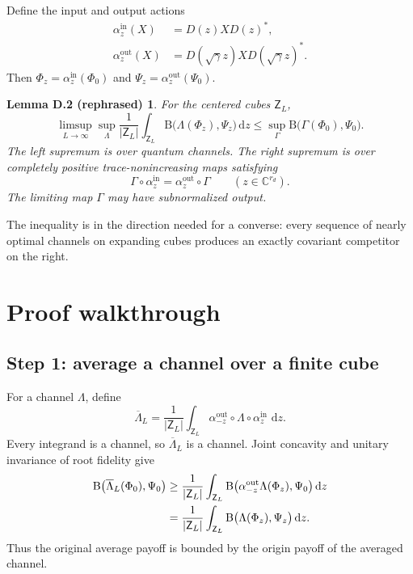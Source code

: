\documentclass[11pt]{article}
\newcommand{\C}{\mathbb C}
\newcommand{\dd}{\,\mathrm d}
\newcommand{\B}{\mathrm B}
\newtheorem*{lemmaD}{Lemma D.2 (rephrased)}
\begin{document}
Define the input and output actions
\begin{align}
  \alpha_z^{\mathrm{in}}(X)&=D(z)XD(z)^*,\label{eq:input-action}\\
  \alpha_z^{\mathrm{out}}(X)&=D(\sqrt\gamma z)XD(\sqrt\gamma z)^*.
  \label{eq:output-action}
\end{align}
Then $\Phi_z=\alpha_z^{\mathrm{in}}(\Phi_0)$ and
$\Psi_z=\alpha_z^{\mathrm{out}}(\Psi_0)$.

\begin{lemmaD}
For the centered cubes $\mathsf Z_L$,
\begin{equation}\label{eq:main-bound}
  \limsup_{L\to\infty}\sup_\Lambda
  \frac1{|\mathsf Z_L|}\int_{\mathsf Z_L}
  \B\bigl(\Lambda(\Phi_z),\Psi_z\bigr)\dd z
  \leq
  \sup_\Gamma\B\bigl(\Gamma(\Phi_0),\Psi_0\bigr).
\end{equation}
The left supremum is over quantum channels.  The right supremum is over
completely positive trace-nonincreasing maps satisfying
\[
  \Gamma\circ\alpha_z^{\mathrm{in}}
  =\alpha_z^{\mathrm{out}}\circ\Gamma
  \qquad(z\in\C^{r_d}).
\]
The limiting map $\Gamma$ may have subnormalized output.
\end{lemmaD}

The inequality is in the direction needed for a converse: every sequence of
nearly optimal channels on expanding cubes produces an exactly covariant
competitor on the right.

\section{Proof walkthrough}

\subsection{Step 1: average a channel over a finite cube}

For a channel $\Lambda$, define
\begin{equation}\label{eq:averaged-channel}
  \overline\Lambda_L
  =\frac1{|\mathsf Z_L|}\int_{\mathsf Z_L}
  \alpha_{-z}^{\mathrm{out}}\circ\Lambda
  \circ\alpha_z^{\mathrm{in}}\,\dd z.
\end{equation}
Every integrand is a channel, so $\overline\Lambda_L$ is a channel.  Joint
concavity and unitary invariance of root fidelity give
\begin{align}
  \B\bigl(\overline\Lambda_L(\Phi_0),\Psi_0\bigr)
  &\geq\frac1{|\mathsf Z_L|}\int_{\mathsf Z_L}
  \B\bigl(
    \alpha_{-z}^{\mathrm{out}}\Lambda(\Phi_z),\Psi_0
  \bigr)\dd z\notag\\
  &=\frac1{|\mathsf Z_L|}\int_{\mathsf Z_L}
  \B\bigl(\Lambda(\Phi_z),\Psi_z\bigr)\dd z.
  \label{eq:concavity-step}
\end{align}
Thus the original average payoff is bounded by the origin payoff of the
averaged channel.
\end{document}
